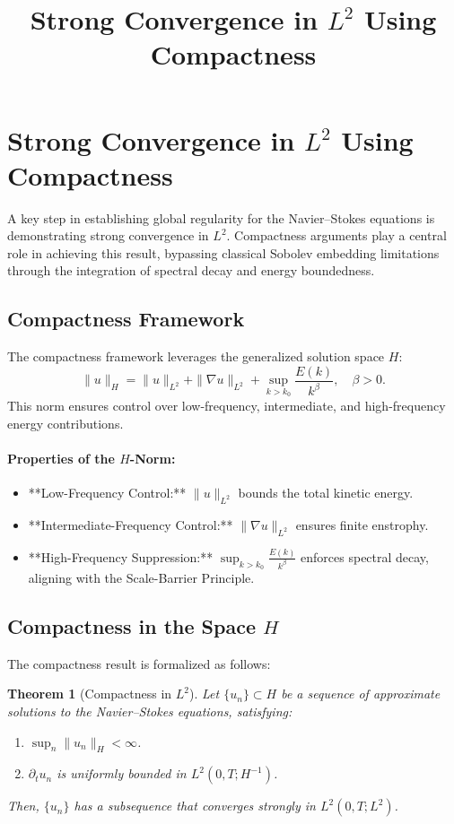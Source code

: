\documentclass[12pt]{article}
\newtheorem{theorem}{Theorem}[section]
\theoremstyle{definition}
\begin{document}
\title{Strong Convergence in $L^2$ Using Compactness}
\author{}
\date{}
\maketitle

\section{Strong Convergence in $L^2$ Using Compactness}

A key step in establishing global regularity for the Navier--Stokes equations is demonstrating strong convergence in $L^2$. Compactness arguments play a central role in achieving this result, bypassing classical Sobolev embedding limitations through the integration of spectral decay and energy boundedness.

\subsection{Compactness Framework}
The compactness framework leverages the generalized solution space $H$:
\begin{equation}
\|u\|_H = \|u\|_{L^2} + \|\nabla u\|_{L^2} + \sup_{k > k_0} \frac{E(k)}{k^\beta}, \quad \beta > 0.
\end{equation}
This norm ensures control over low-frequency, intermediate, and high-frequency energy contributions.

\paragraph{Properties of the $H$-Norm:}
\begin{itemize}
    \item **Low-Frequency Control:** $\|u\|_{L^2}$ bounds the total kinetic energy.
    \item **Intermediate-Frequency Control:** $\|\nabla u\|_{L^2}$ ensures finite enstrophy.
    \item **High-Frequency Suppression:** $\sup_{k > k_0} \frac{E(k)}{k^\beta}$ enforces spectral decay, aligning with the Scale-Barrier Principle.
\end{itemize}

\subsection{Compactness in the Space $H$}
The compactness result is formalized as follows:

\begin{theorem}[Compactness in $L^2$]
Let $\{u_n\} \subset H$ be a sequence of approximate solutions to the Navier--Stokes equations, satisfying:
\begin{enumerate}
    \item $\sup_n \|u_n\|_H < \infty$.
    \item $\partial_t u_n$ is uniformly bounded in $L^2(0, T; H^{-1})$.
\end{enumerate}
Then, $\{u_n\}$ has a subsequence that converges strongly in $L^2(0, T; L^2)$.
\end{theorem}
\end{document}

